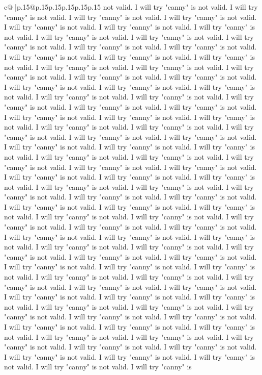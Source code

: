 \documentclass{article}
\begin{document}
{\begin{supertabular}{c@{$\;$}|p{.15\linewidth}@{}p{.15\linewidth}p{.15\linewidth}p{.15\linewidth}p{.15\linewidth}p{.15\linewidth}}
{{{not valid. I will try "canny" is not valid. I will try "canny" is not valid. I will try "canny" is not valid. I will try "canny" is not valid. I will try "canny" is not valid. I will try "canny" is not valid. I will try "canny" is not valid. I will try "canny" is not valid. I will try "canny" is not valid. I will try "canny" is not valid. I will try "canny" is not valid. I will try "canny" is not valid. I will try "canny" is not valid. I will try "canny" is not valid. I will try "canny" is not valid. I will try "canny" is not valid. I will try "canny" is not valid. I will try "canny" is not valid. I will try "canny" is not valid. I will try "canny" is not valid. I will try "canny" is not valid. I will try "canny" is not valid. I will try "canny" is not valid. I will try "canny" is not valid. I will try "canny" is not valid. I will try "canny" is not valid. I will try "canny" is not valid. I will try "canny" is not valid. I will try "canny" is not valid. I will try "canny" is not valid. I will try "canny" is not valid. I will try "canny" is not valid. I will try "canny" is not valid. I will try "canny" is not valid. I will try "canny" is not valid. I will try "canny" is not valid. I will try "canny" is not valid. I will try "canny" is not valid. I will try "canny" is not valid. I will try "canny" is not valid. I will try "canny" is not valid. I will try "canny" is not valid. I will try "canny" is not valid. I will try "canny" is not valid. I will try "canny" is not valid. I will try "canny" is not valid. I will try "canny" is not valid. I will try "canny" is not valid. I will try "canny" is not valid. I will try "canny" is not valid. I will try "canny" is not valid. I will try "canny" is not valid. I will try "canny" is not valid. I will try "canny" is not valid. I will try "canny" is not valid. I will try "canny" is not valid. I will try "canny" is not valid. I will try "canny" is not valid. I will try "canny" is not valid. I will try "canny" is not valid. I will try "canny" is not valid. I will try "canny" is not valid. I will try "canny" is not valid. I will try "canny" is not valid. I will try "canny" is not valid. I will try "canny" is not valid. I will try "canny" is not valid. I will try "canny" is not valid. I will try "canny" is not valid. I will try "canny" is not valid. I will try "canny" is not valid. I will try "canny" is not valid. I will try "canny" is not valid. I will try "canny" is not valid. I will try "canny" is not valid. I will try "canny" is not valid. I will try "canny" is not valid. I will try "canny" is not valid. I will try "canny" is not valid. I will try "canny" is not valid. I will try "canny" is not valid. I will try "canny" is not valid. I will try "canny" is not valid. I will try "canny" is not valid. I will try "canny" is not valid. I will try "canny" is not valid. I will try "canny" is not valid. I will try "canny" is not valid. I will try "canny" is not valid. I will try "canny" is not valid. I will try "canny" is not valid. I will try "canny" is not valid. I will try "canny" is not valid. I will try "canny" is not valid. I will try "canny" is not valid. I will try "canny" is not valid. I will try "canny" is }}}
\end{supertabular}}
\end{document}
